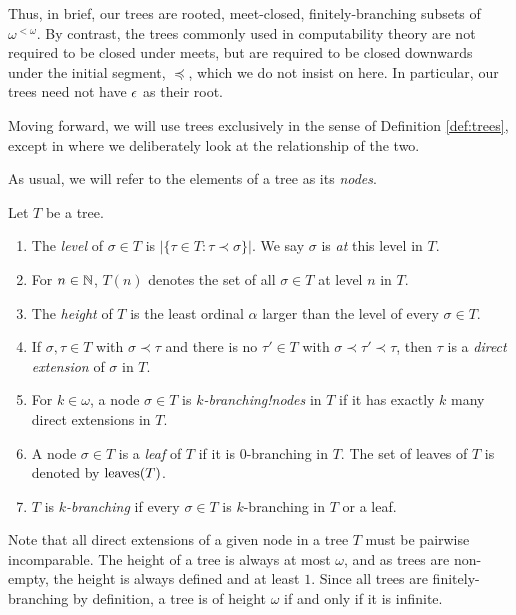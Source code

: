 \noindent Thus, in brief, our trees are rooted, meet-closed, finitely-branching subsets of $\omega^{<\omega}$. By contrast, the trees commonly used in computability theory are not required to be closed under meets, but are required to be closed downwards under the initial segment, $\preceq$, which we do not insist on here. In particular, our trees need not have $\epsilon$ as their root.

Moving forward, we will use trees exclusively in the sense of Definition \ref{def:trees}, except in  where we deliberately look at the relationship of the two.

As usual, we will refer to the elements of a tree as its \emph{nodes}.

\begin{definition}\label{def:treeconcepts}
	Let $T$ be a tree.
	\begin{enumerate}
		\item The \emph{level} of $\sigma \in T$ is $|\{ \tau \in T: \tau \prec \sigma \}|$. We say $\sigma$ is \emph{at} this level in $T$.
		\item For $n \in \mathbb{N}$, $T(n)$ denotes the set of all $\sigma \in T$ at level $n$ in $T$.
		\item The \emph{height} of $T$ is the least ordinal $\alpha$ larger than the level of every $\sigma \in T$.
		\item If $\sigma,\tau \in T$ with $\sigma \prec \tau$ and there is no $\tau' \in T$ with $\sigma \prec \tau' \prec \tau$, then $\tau$ is a \emph{direct extension} of $\sigma$ in $T$.
		\item For $k \in \omega$, a node $\sigma \in T$ is \emph{$k$-branching!nodes} in $T$ if it has exactly $k$ many direct extensions in $T$.
		\item A node $\sigma \in T$ is a \emph{leaf} of $T$ if it is $0$-branching in $T$. The set of leaves of $T$ is denoted by $\operatorname{leaves}(T)$.
		\item $T$ is \emph{$k$-branching} if every $\sigma \in T$ is $k$-branching in $T$ or a leaf.
	\end{enumerate}
\end{definition}

\noindent Note that all direct extensions of a given node in a tree $T$ must be pairwise incomparable. The height of a tree is always at most $\omega$, and as trees are non-empty, the height is always defined and at least $1$. Since all trees are finitely-branching by definition, a tree is of height $\omega$ if and only if it is infinite.

